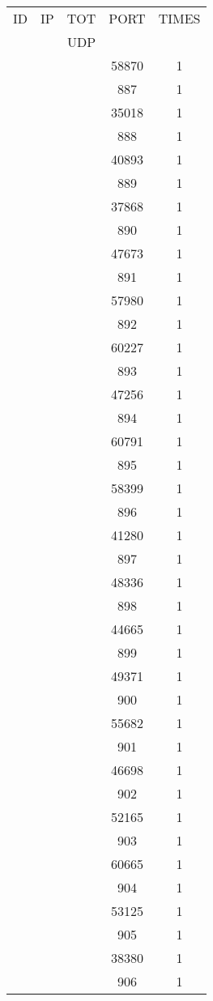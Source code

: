 \documentclass[a4paper]{scrartcl}
\begin{document}
\begin{minipage}[b]{0.5\linewidth}
\begin{tabular}{| c | c | c | c | c |}
\hline
ID & IP & TOT & PORT & TIMES \\ 
   &    & UDP &      &       \\ 
\hline
& & & 58870 & 1 \\ & & & 887 & 1 \\ & & & 35018 & 1 \\ & & & 888 & 1 \\ & & & 40893 & 1 \\ & & & 889 & 1 \\ & & & 37868 & 1 \\ & & & 890 & 1 \\ & & & 47673 & 1 \\ & & & 891 & 1 \\ & & & 57980 & 1 \\ & & & 892 & 1 \\ & & & 60227 & 1 \\ & & & 893 & 1 \\ & & & 47256 & 1 \\ & & & 894 & 1 \\ & & & 60791 & 1 \\ & & & 895 & 1 \\ & & & 58399 & 1 \\ & & & 896 & 1 \\ & & & 41280 & 1 \\ & & & 897 & 1 \\ & & & 48336 & 1 \\ & & & 898 & 1 \\ & & & 44665 & 1 \\ & & & 899 & 1 \\ & & & 49371 & 1 \\ & & & 900 & 1 \\ & & & 55682 & 1 \\ & & & 901 & 1 \\ & & & 46698 & 1 \\ & & & 902 & 1 \\ & & & 52165 & 1 \\ & & & 903 & 1 \\ & & & 60665 & 1 \\ & & & 904 & 1 \\ & & & 53125 & 1 \\ & & & 905 & 1 \\ & & & 38380 & 1 \\ & & & 906 & 1 \\ \hline\end{tabular}\end{minipage} \hfill\begin{minipage}[b]{0.5\linewidth}\begin{tabular}{| c | c | c | c | c |}

\end{tabular}
\end{minipage}
\end{document}

